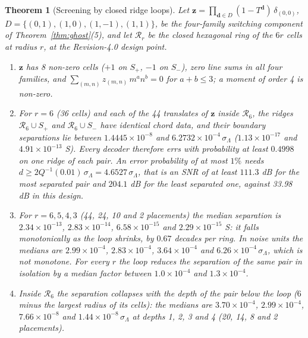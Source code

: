 \documentclass[11pt,a4paper]{article}
\newtheorem{theorem}{Theorem}[section]
\theoremstyle{definition}
\theoremstyle{remark}
\begin{document}
\begin{theorem}[Screening by closed ridge loops]\label{thm:screen}
Let $\mathbf{z} = \prod_{\mathbf{d}\in D}(1-T^{\mathbf{d}})\,\delta_{(0,0)}$, $D = \{(0,1),(1,0),(1,-1),(1,1)\}$, be the four-family switching component of Theorem~\ref{thm:ghost}(5), and let $\mathcal{R}_r$ be the closed hexagonal ring of the $6r$ cells at radius $r$, at the Revision-4.0 design point.
\begin{enumerate}
\item $\mathbf{z}$ has 8 non-zero cells ($+1$ on $S_+$, $-1$ on $S_-$), zero line sums in all four families, and $\sum_{(m,n)} z_{(m,n)}\,m^a n^b = 0$ for $a+b\le3$; a moment of order 4 is non-zero.
\item For $r = 6$ (36 cells) and each of the 44 translates of $\mathbf{z}$ inside $\mathcal{R}_6$, the ridges $\mathcal{R}_6\cup S_+$ and $\mathcal{R}_6\cup S_-$ have identical chord data, and their boundary separations lie between $1.4445\times10^{-8}$ and $6.2732\times10^{-4}\,\sigma_\Lambda$ ($1.13\times10^{-17}$ and $4.91\times10^{-13}$ S). Every decoder therefore errs with probability at least $0.4998$ on one ridge of each pair. An error probability of at most $1\%$ needs $d\ge 2Q^{-1}(0.01)\,\sigma_\Lambda = 4.6527\,\sigma_\Lambda$, that is an SNR of at least $111.3$ dB for the most separated pair and $204.1$ dB for the least separated one, against 33.98 dB in this design.
\item For $r = 6,5,4,3$ (44, 24, 10 and 2 placements) the median separation is $2.34\times10^{-13}$, $2.83\times10^{-14}$, $6.58\times10^{-15}$ and $2.29\times10^{-15}$ S: it falls monotonically as the loop shrinks, by $0.67$ decades per ring. In noise units the medians are $2.99\times10^{-4}$, $2.83\times10^{-4}$, $3.64\times10^{-4}$ and $6.26\times10^{-4}\,\sigma_\Lambda$, which is not monotone. For every $r$ the loop reduces the separation of the same pair in isolation by a median factor between $1.0\times10^{-4}$ and $1.3\times10^{-4}$.
\item Inside $\mathcal{R}_6$ the separation collapses with the depth of the pair below the loop ($6$ minus the largest radius of its cells): the medians are $3.70\times10^{-4}$, $2.99\times10^{-4}$, $7.66\times10^{-8}$ and $1.44\times10^{-8}\,\sigma_\Lambda$ at depths 1, 2, 3 and 4 (20, 14, 8 and 2 placements).
\end{enumerate}
\end{theorem}
\end{document}
